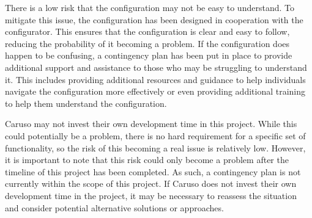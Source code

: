 There is a low risk that the configuration may not be easy to understand. To mitigate this issue, the configuration has been designed in cooperation with the configurator. This ensures that the configuration is clear and easy to follow, reducing the probability of it becoming a problem. If the configuration does happen to be confusing, a contingency plan has been put in place to provide additional support and assistance to those who may be struggling to understand it. This includes providing additional resources and guidance to help individuals navigate the configuration more effectively or even providing additional training to help them understand the configuration.

Caruso may not invest their own development time in this project. While this could potentially be a problem, there is no hard requirement for a specific set of functionality, so the risk of this becoming a real issue is relatively low. However, it is important to note that this risk could only become a problem after the timeline of this project has been completed. As such, a contingency plan is not currently within the scope of this project. If Caruso does not invest their own development time in the project, it may be necessary to reassess the situation and consider potential alternative solutions or approaches.


